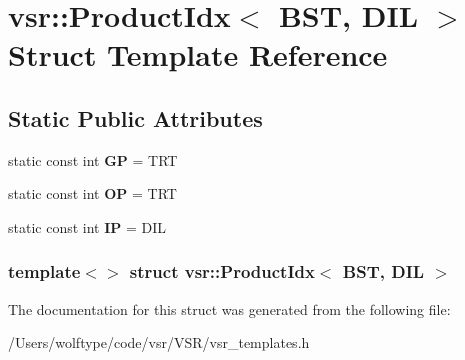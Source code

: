 \hypertarget{structvsr_1_1_product_idx_3_01_b_s_t_00_01_d_i_l_01_4}{\section{vsr\-:\-:Product\-Idx$<$ B\-S\-T, D\-I\-L $>$ Struct Template Reference}
\label{structvsr_1_1_product_idx_3_01_b_s_t_00_01_d_i_l_01_4}
}
\subsection*{Static Public Attributes}
\begin{DoxyCompactItemize}
\item 
\hypertarget{structvsr_1_1_product_idx_3_01_b_s_t_00_01_d_i_l_01_4_ac9d85b27b4b89417ac8fa9ef41dcfec6}{static const int {\bfseries G\-P} = T\-R\-T}\label{structvsr_1_1_product_idx_3_01_b_s_t_00_01_d_i_l_01_4_ac9d85b27b4b89417ac8fa9ef41dcfec6}

\item 
\hypertarget{structvsr_1_1_product_idx_3_01_b_s_t_00_01_d_i_l_01_4_a3a333883f7fb4dc4be78a31a59743647}{static const int {\bfseries O\-P} = T\-R\-T}\label{structvsr_1_1_product_idx_3_01_b_s_t_00_01_d_i_l_01_4_a3a333883f7fb4dc4be78a31a59743647}

\item 
\hypertarget{structvsr_1_1_product_idx_3_01_b_s_t_00_01_d_i_l_01_4_a108da2bd315f450e16d21e0981470f06}{static const int {\bfseries I\-P} = D\-I\-L}\label{structvsr_1_1_product_idx_3_01_b_s_t_00_01_d_i_l_01_4_a108da2bd315f450e16d21e0981470f06}

\end{DoxyCompactItemize}
\subsubsection*{template$<$$>$ struct vsr\-::\-Product\-Idx$<$ B\-S\-T, D\-I\-L $>$}



The documentation for this struct was generated from the following file\-:\begin{DoxyCompactItemize}
\item 
/\-Users/wolftype/code/vsr/\-V\-S\-R/vsr\-\_\-templates.\-h\end{DoxyCompactItemize}
